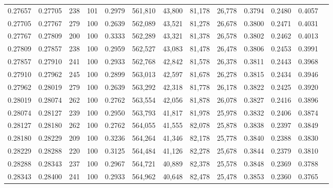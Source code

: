 \begin{tabular}{rrrrrrrrrrrrr}
0.27657 & 0.27705 &   238 & 101 &                                     0.2979 & 561,810 &  43,800 &  81,178 &  26,778 & 0.3794 & 0.2480 & 0.4057 \\
0.27705 & 0.27767 &   279 & 100 &                                     0.2639 & 562,089 &  43,521 &  81,278 &  26,678 & 0.3800 & 0.2471 & 0.4031 \\
0.27767 & 0.27809 &   200 & 100 &                                     0.3333 & 562,289 &  43,321 &  81,378 &  26,578 & 0.3802 & 0.2462 & 0.4013 \\
0.27809 & 0.27857 &   238 & 100 &                                     0.2959 & 562,527 &  43,083 &  81,478 &  26,478 & 0.3806 & 0.2453 & 0.3991 \\
0.27857 & 0.27910 &   241 & 100 &                                     0.2933 & 562,768 &  42,842 &  81,578 &  26,378 & 0.3811 & 0.2443 & 0.3968 \\
0.27910 & 0.27962 &   245 & 100 &                                     0.2899 & 563,013 &  42,597 &  81,678 &  26,278 & 0.3815 & 0.2434 & 0.3946 \\
0.27962 & 0.28019 &   279 & 100 &                                     0.2639 & 563,292 &  42,318 &  81,778 &  26,178 & 0.3822 & 0.2425 & 0.3920 \\
0.28019 & 0.28074 &   262 & 100 &                                     0.2762 & 563,554 &  42,056 &  81,878 &  26,078 & 0.3827 & 0.2416 & 0.3896 \\
0.28074 & 0.28127 &   239 & 100 &                                     0.2950 & 563,793 &  41,817 &  81,978 &  25,978 & 0.3832 & 0.2406 & 0.3874 \\
0.28127 & 0.28180 &   262 & 100 &                                     0.2762 & 564,055 &  41,555 &  82,078 &  25,878 & 0.3838 & 0.2397 & 0.3849 \\
0.28180 & 0.28229 &   209 & 100 &                                     0.3236 & 564,264 &  41,346 &  82,178 &  25,778 & 0.3840 & 0.2388 & 0.3830 \\
0.28229 & 0.28288 &   220 & 100 &                                     0.3125 & 564,484 &  41,126 &  82,278 &  25,678 & 0.3844 & 0.2379 & 0.3810 \\
0.28288 & 0.28343 &   237 & 100 &                                     0.2967 & 564,721 &  40,889 &  82,378 &  25,578 & 0.3848 & 0.2369 & 0.3788 \\
0.28343 & 0.28400 &   241 & 100 &                                     0.2933 & 564,962 &  40,648 &  82,478 &  25,478 & 0.3853 & 0.2360 & 0.3765 \\

\end{tabular}
